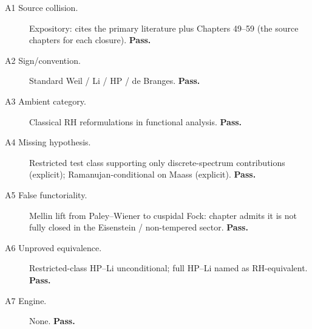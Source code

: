 \begin{description}
\item[A1 Source collision.] Expository: cites the primary
literature plus Chapters 49--59 (the source chapters for each closure).
\textbf{Pass.}
\item[A2 Sign/convention.] Standard Weil / Li / HP /
de Branges. \textbf{Pass.}
\item[A3 Ambient category.] Classical RH reformulations in
functional analysis. \textbf{Pass.}
\item[A4 Missing hypothesis.] Restricted test class supporting only
discrete-spectrum contributions (explicit); Ramanujan-conditional
on Maass (explicit). \textbf{Pass.}
\item[A5 False functoriality.] Mellin lift from Paley--Wiener to
cuspidal Fock: chapter admits it is not fully closed in the
Eisenstein / non-tempered sector.
\textbf{Pass.}
\item[A6 Unproved equivalence.] Restricted-class HP--Li
unconditional; full HP--Li named as RH-equivalent. \textbf{Pass.}
\item[A7 Engine.] None. \textbf{Pass.}
\end{description}

